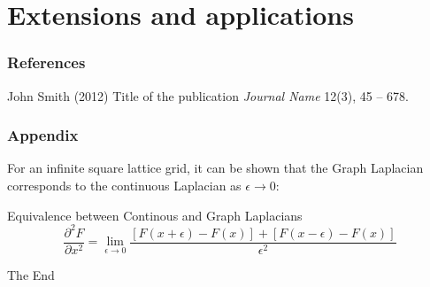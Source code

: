 \documentclass{beamer}
\begin{document}
\section{Extensions and applications}


\begin{frame}
\frametitle{References}
\footnotesize{
\begin{thebibliography}{99} %
 John Smith (2012)
\newblock Title of the publication
\newblock \emph{Journal Name} 12(3), 45 -- 678.
\end{thebibliography}
}
\end{frame}


\begin{frame}
\frametitle{Appendix}

For an infinite square lattice grid, it can be shown that the Graph Laplacian
corresponds to the continuous Laplacian as $\epsilon \rightarrow 0$:

  \begin{block}{Equivalence between Continous and Graph Laplacians}
    \begin{equation}
      \frac{\partial^2 F}{\partial x^2} = \lim_{\epsilon \rightarrow 0} \frac{[F(x + \epsilon) - F(x)] + [F(x - \epsilon) - F(x)]}{\epsilon^2}
    \end{equation}
  \end{block}

\end{frame}



\begin{frame}
\Huge{\centerline{The End}}
\end{frame}

\end{document}
